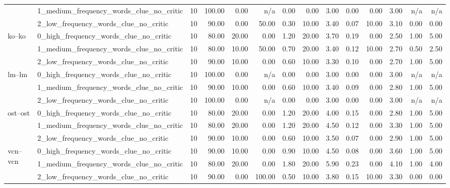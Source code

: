 \begin{tabular}{llrrrrrrrrrrrr}
 & 1_medium_frequency_words_clue_no_critic & 10 & 100.00 & 0.00 & n/a & 0.00 & 0.00 & 3.00 & 0.00 & 0.00 & 3.00 & n/a & n/a \\
 & 2_low_frequency_words_clue_no_critic & 10 & 90.00 & 0.00 & 50.00 & 0.30 & 10.00 & 3.40 & 0.07 & 10.00 & 3.10 & 0.00 & 0.00 \\
\cline{1-14}
\multirow[t]{3}{*}{ko--ko} & 0_high_frequency_words_clue_no_critic & 10 & 80.00 & 20.00 & 0.00 & 1.20 & 20.00 & 3.70 & 0.19 & 0.00 & 2.50 & 1.00 & 5.00 \\
 & 1_medium_frequency_words_clue_no_critic & 10 & 80.00 & 10.00 & 50.00 & 0.70 & 20.00 & 3.40 & 0.12 & 10.00 & 2.70 & 0.50 & 2.50 \\
 & 2_low_frequency_words_clue_no_critic & 10 & 90.00 & 10.00 & 0.00 & 0.60 & 10.00 & 3.30 & 0.10 & 0.00 & 2.70 & 1.00 & 5.00 \\
\cline{1-14}
\multirow[t]{3}{*}{lm--lm} & 0_high_frequency_words_clue_no_critic & 10 & 100.00 & 0.00 & n/a & 0.00 & 0.00 & 3.00 & 0.00 & 0.00 & 3.00 & n/a & n/a \\
 & 1_medium_frequency_words_clue_no_critic & 10 & 90.00 & 10.00 & 0.00 & 0.60 & 10.00 & 3.40 & 0.09 & 0.00 & 2.80 & 1.00 & 5.00 \\
 & 2_low_frequency_words_clue_no_critic & 10 & 100.00 & 0.00 & n/a & 0.00 & 0.00 & 3.00 & 0.00 & 0.00 & 3.00 & n/a & n/a \\
\cline{1-14}
\multirow[t]{3}{*}{ost--ost} & 0_high_frequency_words_clue_no_critic & 10 & 80.00 & 20.00 & 0.00 & 1.20 & 20.00 & 4.00 & 0.15 & 0.00 & 2.80 & 1.00 & 5.00 \\
 & 1_medium_frequency_words_clue_no_critic & 10 & 80.00 & 20.00 & 0.00 & 1.20 & 20.00 & 4.50 & 0.12 & 0.00 & 3.30 & 1.00 & 5.00 \\
 & 2_low_frequency_words_clue_no_critic & 10 & 90.00 & 10.00 & 0.00 & 0.60 & 10.00 & 3.50 & 0.07 & 0.00 & 2.90 & 1.00 & 5.00 \\
\cline{1-14}
\multirow[t]{3}{*}{vcn--vcn} & 0_high_frequency_words_clue_no_critic & 10 & 90.00 & 10.00 & 0.00 & 0.90 & 10.00 & 4.50 & 0.08 & 0.00 & 3.60 & 1.00 & 5.00 \\
 & 1_medium_frequency_words_clue_no_critic & 10 & 80.00 & 20.00 & 0.00 & 1.80 & 20.00 & 5.90 & 0.23 & 0.00 & 4.10 & 1.00 & 4.00 \\
 & 2_low_frequency_words_clue_no_critic & 10 & 90.00 & 0.00 & 100.00 & 0.50 & 10.00 & 3.80 & 0.15 & 10.00 & 3.30 & 0.00 & 0.00 \\
\cline{1-14}
\bottomrule
\end{tabular}
